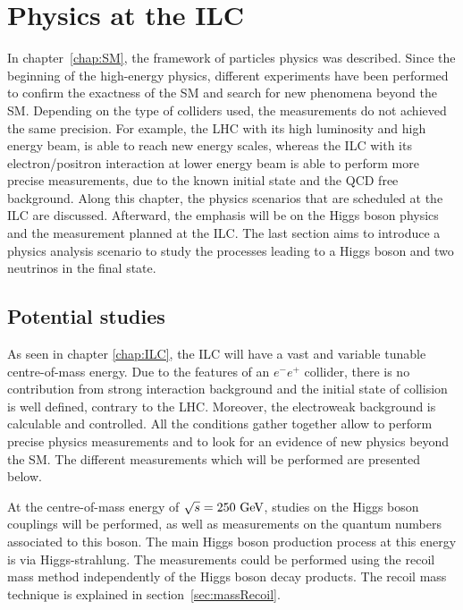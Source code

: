 \chapter{Physics at the ILC}
\label{chap:phyics}

  In chapter~\ref{chap:SM}, the framework of particles physics was described. 
  Since the beginning of the high-energy physics, different experiments have been performed to confirm the exactness of the \acrfull{SM} and search for new phenomena beyond the \gls{SM}.
  Depending on the type of colliders used, the measurements do not achieved the same precision. 
  For example, the \gls{LHC} with its high luminosity and high energy beam, is able to reach new energy scales, whereas the \gls{ILC} with its electron/positron interaction at lower energy beam is able to perform more precise measurements, due to the known initial state and the \gls{QCD} free background. 
  Along this chapter, the physics scenarios that are scheduled at the \gls{ILC} are discussed. 
  Afterward, the emphasis will be on the Higgs boson physics and the measurement planned at the \gls{ILC}. 
  The last section aims to introduce a physics analysis scenario to study the processes leading to a Higgs boson and two neutrinos in the final state.
 
 \minitoc

  \section{Potential studies}

  As seen in chapter \ref{chap:ILC}, the \gls{ILC} will have a vast and variable tunable centre-of-mass energy.
  Due to the features of an $e^-e^+$ collider, there is no contribution from strong interaction background and the initial state of collision is well defined, contrary to the \gls{LHC}.
  Moreover, the electroweak background is calculable and controlled.
  All the conditions gather together allow to perform precise physics measurements and to look for an evidence of new physics beyond the \gls{SM}.
  The different measurements which will be performed are presented below.

  At the centre-of-mass energy of $\sqrt{s} = 250~\rm{GeV}$, studies on the Higgs boson couplings will be performed, as well as measurements on the quantum numbers associated to this boson.
  The main Higgs boson production process at this energy is via Higgs-strahlung.
  The measurements could be performed using the recoil mass method independently of the Higgs boson decay products.
  The recoil mass technique is explained in section~\ref{sec:massRecoil}.
 
